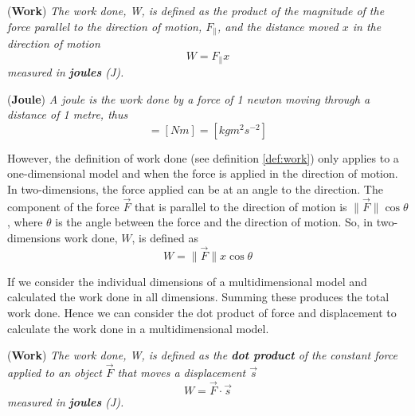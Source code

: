\begin{definition}{(\textbf{Work})}
\label{def:work}
\textit{The work done, W, is defined as the product of the magnitude of the force parallel to the direction of motion, $F_{\|}$, and the distance moved $x$ in the direction of motion}
\begin{equation}
    W = F_{\|} x
\end{equation}
\textit{measured in \textbf{joules} (J).}
\end{definition}

\begin{definition}{(\textbf{Joule})}
\textit{A joule is the work done by a force of 1 newton moving through a distance of 1 metre, thus }
\begin{equation*}
    [J] = [Nm] = [kgm^2s^{-2}]
\end{equation*}
\end{definition}

However, the definition of work done (see definition \ref{def:work}) only applies to a one-dimensional model and when the force is applied in the direction of motion. In two-dimensions, the force applied can be at an angle to the direction. The component of the force $\vec{F}$ that is parallel to the direction of motion is $\| \vec{F} \| \cos \theta$, where $\theta$ is the angle between the force and the direction of motion. So, in two-dimensions work done, $W$, is defined as
\begin{equation}
    W = \| \vec{F} \| x\cos \theta
\end{equation}

If we consider the individual dimensions of a multidimensional model and calculated the work done in all dimensions. Summing these produces the total work done. Hence we can consider the dot product of force and displacement to calculate the work done in a multidimensional model.

\begin{definition}{(\textbf{Work})}
\textit{The work done, W, is defined as the \textbf{dot product} of the constant force applied to an object $\vec{F}$ that moves a displacement $\vec{s}$}
\begin{equation}
    W = \vec{F} \cdot \vec{s} 
\end{equation}
\textit{measured in \textbf{joules} (J).}
\end{definition}

